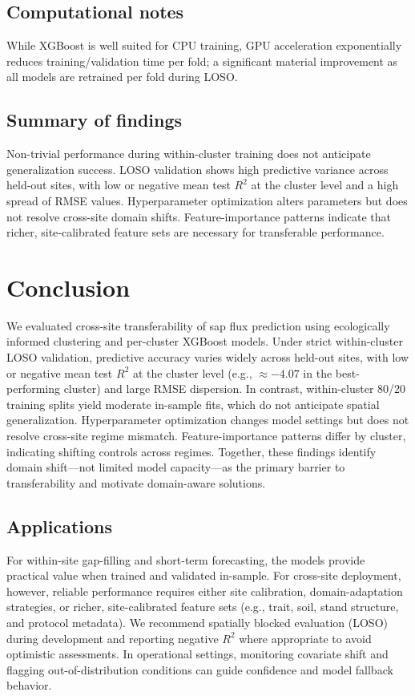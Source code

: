 \documentclass[graybox]{svmult}
\begin{document}
\subsection{Computational notes}
While XGBoost is well suited for CPU training, GPU acceleration exponentially reduces training/validation time per fold; a significant material improvement as all models are retrained per fold during LOSO.

\subsection{Summary of findings}
Non-trivial performance during within-cluster training does not anticipate generalization success. LOSO validation shows high predictive variance across held-out sites, with low or negative mean test $R^2$ at the cluster level and a high spread of RMSE values. Hyperparameter optimization alters parameters but does not resolve cross-site domain shifts. Feature-importance patterns indicate that richer, site‑calibrated feature sets are necessary for transferable performance.
\section{Conclusion}
\label{sec:5}
We evaluated cross-site transferability of sap flux prediction using ecologically informed clustering and per-cluster XGBoost models. Under strict within-cluster LOSO validation, predictive accuracy varies widely across held-out sites, with low or negative mean test $R^2$ at the cluster level (e.g., $\approx -4.07$ in the best-performing cluster) and large RMSE dispersion. In contrast, within-cluster 80/20 training splits yield moderate in-sample fits, which do not anticipate spatial generalization. Hyperparameter optimization changes model settings but does not resolve cross-site regime mismatch. Feature-importance patterns differ by cluster, indicating shifting controls across regimes. Together, these findings identify domain shift—not limited model capacity—as the primary barrier to transferability and motivate domain-aware solutions.

\subsection{Applications} %
For within-site gap-filling and short-term forecasting, the models provide practical value when trained and validated in-sample. For cross-site deployment, however, reliable performance requires either site calibration, domain-adaptation strategies, or richer, site-calibrated feature sets (e.g., trait, soil, stand structure, and protocol metadata). We recommend spatially blocked evaluation (LOSO) during development and reporting negative $R^2$ where appropriate to avoid optimistic assessments. In operational settings, monitoring covariate shift and flagging out-of-distribution conditions can guide confidence and model fallback behavior.
\end{document}
